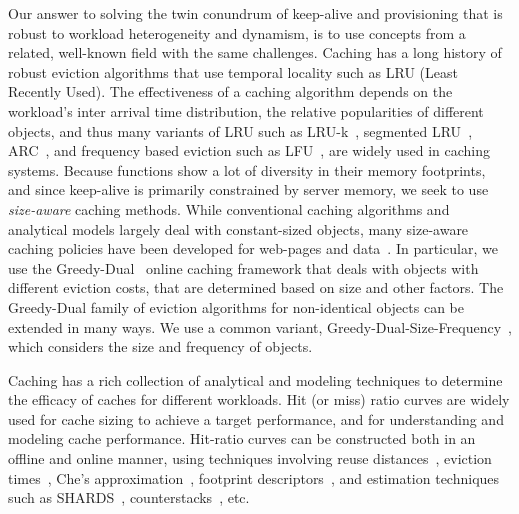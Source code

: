 Our answer to solving the twin conundrum of keep-alive and provisioning that is robust to workload heterogeneity and dynamism, is to use concepts from a related, well-known field with the same challenges. 
%
Caching has a long history of robust eviction algorithms that use temporal locality such as  LRU (Least Recently Used). 
The effectiveness of a caching algorithm depends on the workload's inter arrival time distribution, the relative popularities of different objects, and thus many variants of LRU such as LRU-k~\cite{o1993lru}, segmented LRU~\cite{cheng2000lru}, ARC~\cite{megiddo2003arc}, and frequency based eviction such as LFU~\cite{einziger2017tinylfu}, are widely used in caching systems. 
Because functions show a lot of diversity in their memory footprints, and since keep-alive is primarily constrained by server memory, we seek to use \emph{size-aware} caching methods. 
While conventional caching algorithms and analytical models largely deal with constant-sized objects, many size-aware caching policies have been developed for web-pages and data~\cite{cao_irani_1997}. 
In particular, we use the Greedy-Dual~\cite{young_gd_orig_94} online caching framework that deals with objects with different eviction costs, that are determined based on size and other factors.
The Greedy-Dual family of eviction algorithms for non-identical objects can be extended in many ways.
We use a common variant, Greedy-Dual-Size-Frequency~\cite{gdsf, gdfs_2001,cherkasova2001role}, which considers the size and frequency of objects. 


%



Caching has a rich collection of analytical and modeling techniques to determine the efficacy of caches for different workloads.
Hit (or miss) ratio curves are widely used for cache sizing to achieve a target performance, and for understanding and modeling cache performance. 
Hit-ratio curves can be constructed both in an offline and online manner, using techniques involving reuse distances~\cite{osca_atc20}, eviction times~\cite{hu2016kinetic}, Che's approximation~\cite{che2002hierarchical}, footprint descriptors~\cite{sundarrajan2017footprint}, and estimation techniques such as SHARDS~\cite{shards}, counterstacks~\cite{counterstacks}, etc. 














